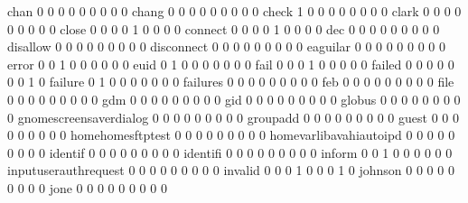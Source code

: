 \documentclass[compress,8pt]{beamer}
\begin{document}
\begin{frame}
\begin{Schunk}
  chan                                       0   0   0   0   0   0   0   0   0
  chang                                      0   0   0   0   0   0   0   0   0
  check                                      1   0   0   0   0   0   0   0   0
  clark                                      0   0   0   0   0   0   0   0   0
  close                                      0   0   0   0   1   0   0   0   0
  connect                                    0   0   0   0   1   0   0   0   0
  dec                                        0   0   0   0   0   0   0   0   0
  disallow                                   0   0   0   0   0   0   0   0   0
  disconnect                                 0   0   0   0   0   0   0   0   0
  eaguilar                                   0   0   0   0   0   0   0   0   0
  error                                      0   0   1   0   0   0   0   0   0
  euid                                       0   1   0   0   0   0   0   0   0
  fail                                       0   0   0   1   0   0   0   0   0
  failed                                     0   0   0   0   0   0   0   1   0
  failure                                    0   1   0   0   0   0   0   0   0
  failures                                   0   0   0   0   0   0   0   0   0
  feb                                        0   0   0   0   0   0   0   0   0
  file                                       0   0   0   0   0   0   0   0   0
  gdm                                        0   0   0   0   0   0   0   0   0
  gid                                        0   0   0   0   0   0   0   0   0
  globus                                     0   0   0   0   0   0   0   0   0
  gnomescreensaverdialog                     0   0   0   0   0   0   0   0   0
  groupadd                                   0   0   0   0   0   0   0   0   0
  guest                                      0   0   0   0   0   0   0   0   0
  homehomesftptest                           0   0   0   0   0   0   0   0   0
  homevarlibavahiautoipd                     0   0   0   0   0   0   0   0   0
  identif                                    0   0   0   0   0   0   0   0   0
  identifi                                   0   0   0   0   0   0   0   0   0
  inform                                     0   0   1   0   0   0   0   0   0
  inputuserauthrequest                       0   0   0   0   0   0   0   0   0
  invalid                                    0   0   0   1   0   0   0   1   0
  johnson                                    0   0   0   0   0   0   0   0   0
  jone                                       0   0   0   0   0   0   0   0   0

\end{Schunk}
\end{frame}
\end{document}
